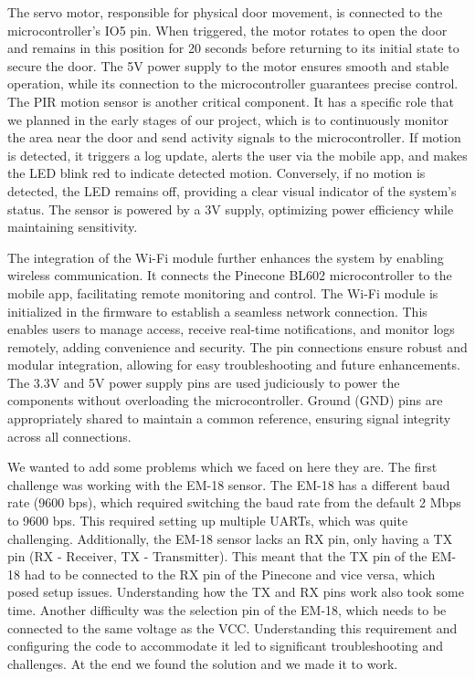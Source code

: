 \documentclass[USenglish,oneside,twocolumn]{article}
\begin{document}
The servo motor, responsible for physical door movement, is connected to the microcontroller’s IO5 pin. When triggered, the motor rotates to open the door and remains in this position for 20 seconds before returning to its initial state to secure the door. The 5V power supply to the motor ensures smooth and stable operation, while its connection to the microcontroller guarantees precise control. The PIR motion sensor is another critical component. It has a specific role that we planned in the early stages of our project, which is to continuously monitor the area near the door and send activity signals to the microcontroller. If motion is detected, it triggers a log update, alerts the user via the mobile app, and makes the LED blink red to indicate detected motion. Conversely, if no motion is detected, the LED remains off, providing a clear visual indicator of the system's status. The sensor is powered by a 3V supply, optimizing power efficiency while maintaining sensitivity.

The integration of the Wi-Fi module further enhances the system by enabling wireless communication. It connects the Pinecone BL602 microcontroller to the mobile app, facilitating remote monitoring and control. The Wi-Fi module is initialized in the firmware to establish a seamless network connection. This enables users to manage access, receive real-time notifications, and monitor logs remotely, adding convenience and security. The pin connections ensure robust and modular integration, allowing for easy troubleshooting and future enhancements. The 3.3V and 5V power supply pins are used judiciously to power the components without overloading the microcontroller. Ground (GND) pins are appropriately shared to maintain a common reference, ensuring signal integrity across all connections.

We wanted to add some problems which we faced on here they are. The first challenge was working with the EM-18 sensor. The EM-18 has a different baud rate (9600 bps), which required switching the baud rate from the default 2 Mbps to 9600 bps. This required setting up multiple UARTs, which was quite challenging. Additionally, the EM-18 sensor lacks an RX pin, only having a TX pin (RX - Receiver, TX - Transmitter). This meant that the TX pin of the EM-18 had to be connected to the RX pin of the Pinecone and vice versa, which posed setup issues. Understanding how the TX and RX pins work also took some time. Another difficulty was the selection pin of the EM-18, which needs to be connected to the same voltage as the VCC. Understanding this requirement and configuring the code to accommodate it led to significant troubleshooting and challenges. At the end we found the solution and we made it to work.
\end{document}
